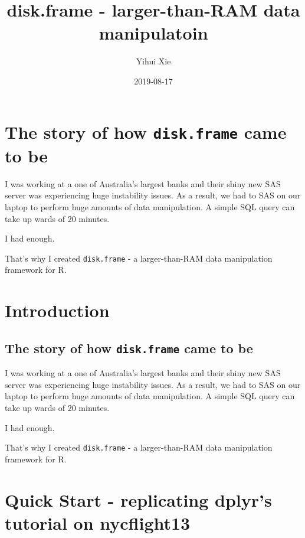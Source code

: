 \documentclass[]{book}
\title{disk.frame - larger-than-RAM data manipulatoin}
\author{Yihui Xie}
\date{2019-08-17}
\begin{document}
\maketitle

{
\setcounter{tocdepth}{1}
\tableofcontents
}
\hypertarget{the-story-of-how-disk.frame-came-to-be}{%
\chapter{\texorpdfstring{The story of how \texttt{disk.frame} came to be}{The story of how disk.frame came to be}}\label{the-story-of-how-disk.frame-came-to-be}}

I was working at a one of Australia's largest banks and their shiny new SAS server was experiencing huge instability issues. As a result, we had to SAS on our laptop to perform huge amounts of data manipulation. A simple SQL query can take up wards of 20 minutes.

I had enough.

That's why I created \texttt{disk.frame} - a larger-than-RAM data manipulation framework for R.

\hypertarget{introduction}{%
\chapter{Introduction}\label{introduction}}

\hypertarget{the-story-of-how-disk.frame-came-to-be-1}{%
\section{\texorpdfstring{The story of how \texttt{disk.frame} came to be}{The story of how disk.frame came to be}}\label{the-story-of-how-disk.frame-came-to-be-1}}

I was working at a one of Australia's largest banks and their shiny new SAS server was experiencing huge instability issues. As a result, we had to SAS on our laptop to perform huge amounts of data manipulation. A simple SQL query can take up wards of 20 minutes.

I had enough.

That's why I created \texttt{disk.frame} - a larger-than-RAM data manipulation framework for R.

\hypertarget{quick-start---replicating-dplyrs-tutorial-on-nycflight13}{%
\chapter{Quick Start - replicating dplyr's tutorial on nycflight13}\label{quick-start---replicating-dplyrs-tutorial-on-nycflight13}}
\end{document}
